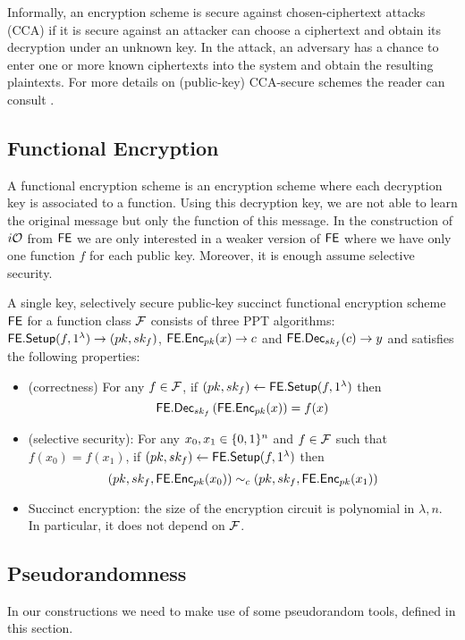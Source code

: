 Informally, an encryption scheme is secure against chosen-ciphertext attacks (CCA) if it is secure against an attacker can choose a ciphertext and obtain its decryption under an unknown key. In the attack, an adversary has a chance to enter one or more known ciphertexts into the system and obtain the resulting plaintexts.
For more details on (public-key) CCA-secure schemes the reader can consult \cite{katz2014introduction}.


\subsection{Functional Encryption}
A functional encryption scheme is an encryption scheme where each decryption key is associated to a function. Using this decryption key, we are not able to learn the original message but only the function of this message. In the construction of $i\mathcal{O}$ from $\mathsf{FE}$ we are only interested in a weaker version of $\mathsf{FE}$ where we have only one function $f$ for each public key. Moreover, it is enough assume selective security.
\begin{mydef}
A single key, selectively secure public-key succinct functional encryption scheme $\mathsf{FE}$ for a function class $\mathcal{F}$ consists of three PPT algorithms: $\mathsf{FE.Setup}(f,1^\lambda)\to(pk,sk_f)$, $\mathsf{FE.Enc}_{pk}(x)\to c$ and $\mathsf{FE.Dec}_{sk_f}(c) \to y$ and satisfies the following properties:
\begin{itemize}
\item (correctness) For any $f\in\mathcal{F}$, if $(pk,sk_f)\gets\mathsf{FE.Setup}(f,1^\lambda)$ then
\[
\mathsf{FE.Dec}_{sk_f}\left(\mathsf{FE.Enc}_{pk}(x)\right)=f(x)
\]
\item (selective security): For any $x_0,x_1\in\{0,1\}^n$ and $f\in\mathcal{F}$ such that $f(x_0)=f(x_1)$, if $(pk,sk_f)\gets\mathsf{FE.Setup}(f,1^\lambda)$ then
\[
\left(pk,sk_f,\mathsf{FE.Enc}_{pk}(x_0)\right)\sim_c \left(pk,sk_f,\mathsf{FE.Enc}_{pk}(x_1)\right)
\]
\item Succinct encryption: the size of the encryption circuit is polynomial in $\lambda,n$. In particular, it does not depend on $\mathcal{F}$.
\end{itemize}
\end{mydef}


\subsection{Pseudorandomness}

In our constructions we need to make use of some pseudorandom tools, defined in this section. 

